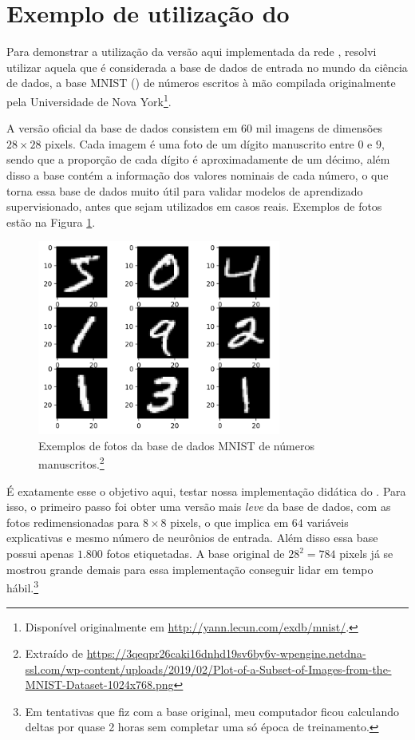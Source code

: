 \section{Exemplo de utilização do }
\label{secao:mnist}

Para demonstrar a utilização da versão aqui implementada da rede , resolvi utilizar aquela que é considerada a base de dados de entrada no mundo da ciência de dados, a base MNIST () de números escritos à mão compilada originalmente pela Universidade de Nova York\footnote{Disponível originalmente em \url{http://yann.lecun.com/exdb/mnist/}.}.

A versão oficial da base de dados consistem em $60$ mil imagens de dimensões $28 \times 28$ pixels. Cada imagem é uma foto de um dígito manuscrito entre $0$ e $9$, sendo que a proporção de cada dígito é aproximadamente de um décimo, além disso a base contém a informação dos valores nominais de cada número, o que torna essa base de dados muito útil para validar modelos de aprendizado supervisionado, antes que sejam utilizados em casos reais. Exemplos de fotos estão na Figura \ref{fig:mnist_fig}.

\begin{figure}[htb]
\centering
\includegraphics[width=8cm]{figuras/mnist}
\caption{Exemplos de fotos da base de dados MNIST de números manuscritos.\footnote{Extraído de \url{https://3qeqpr26caki16dnhd19sv6by6v-wpengine.netdna-ssl.com/wp-content/uploads/2019/02/Plot-of-a-Subset-of-Images-from-the-MNIST-Dataset-1024x768.png}}}
\label{fig:mnist_fig}
\end{figure}

É exatamente esse o objetivo aqui, testar nossa implementação didática do . Para isso, o primeiro passo foi obter uma versão mais \emph{leve} da base de dados, com as fotos redimensionadas para $8 \times 8$ pixels, o que implica em $64$ variáveis explicativas e mesmo número de neurônios de entrada. Além disso essa base possui apenas $1.800$ fotos etiquetadas. A base original de $28^2 = 784$ pixels já se mostrou grande demais para essa implementação conseguir lidar em tempo hábil.\footnote{Em tentativas que fiz com a base original, meu computador ficou calculando deltas por quase 2 horas sem completar uma só época de treinamento.}

